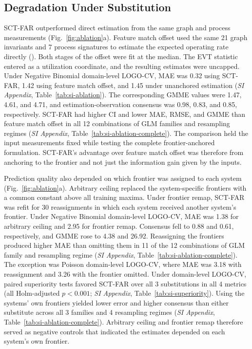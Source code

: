\documentclass{article}
\begin{document}
\subsection*{Degradation Under Substitution}
\label{sub-sec:substitution}
SCT-FAR outperformed direct estimation from the same graph and process measurements (Fig.~\ref{fig:ablation}a). Feature match offset used the same 21 graph invariants and 7 process signatures to estimate the expected operating rate directly (). Both stages of the offset were fit at the median. The EVT statistic entered as a utilization coordinate, and the resulting estimates were uncapped. Under Negative Binomial domain-level LOGO-CV, MAE was 0.32 using SCT-FAR, 1.42 using feature match offset, and 1.45 under unanchored estimation (\textit{SI Appendix}, Table~\ref{tab:si-ablation}). The corresponding GMME values were 1.47, 4.61, and 4.71, and estimation-observation consensus was 0.98, 0.83, and 0.85, respectively. SCT-FAR had higher CI and lower MAE, RMSE, and GMME than feature match offset in all 12 combinations of GLM families and resampling regimes (\textit{SI Appendix}, Table~\ref{tab:si-ablation-complete}). The comparison held the input measurements fixed while testing the complete frontier-anchored formulation. SCT-FAR's advantage over feature match offset was therefore from anchoring to the frontier and not just the information gain given by the inputs.

Prediction quality also depended on which frontier was assigned to each system (Fig.~\ref{fig:ablation}a). Arbitrary ceiling replaced the system-specific frontiers with a common constant above all training maxima. Under frontier remap, SCT-FAR was refit for 30 reassignments in which each system received another system's frontier. Under Negative Binomial domain-level LOGO-CV, MAE was 1.38 for arbitrary ceiling and 2.95 for frontier remap. Consensus fell to 0.88 and 0.61, respectively, and GMME rose to 4.38 and 26.92. Reassigning the frontiers produced higher MAE than omitting them in 11 of the 12 combinations of GLM family and resampling regime (\textit{SI Appendix}, Table~\ref{tab:si-ablation-complete}). The exception was Poisson domain-level LOGO-CV, where MAE was 3.18 with reassignment and 3.26 with the frontier omitted. Under domain-level LOGO-CV, paired superiority tests favored SCT-FAR over all 3 substitutions in all 4 metrics (all Holm-adjusted $p < 0.001$; \textit{SI Appendix}, Table~\ref{tab:si-superiority}). Using the systems' own frontiers yielded lower error and higher consensus than either substitute across all 3 families and 4 resampling regimes (\textit{SI Appendix}, Table~\ref{tab:si-ablation-complete}). Arbitrary ceiling and frontier remap therefore served as negative controls that indicated the estimates depended on each system's own frontier.
\end{document}

